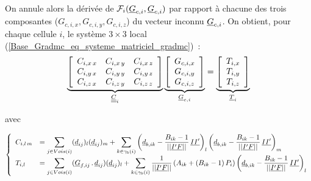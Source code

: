 On annule alors la d\'eriv\'ee de
$\mathcal{F}_i(\underline{G}_{c,i},\underline{G}_{c,i})$ 
par rapport \`a
chacune des trois composantes ($G_{c,i,x}, G_{c,i,y}, G_{c,i,z}$) du vecteur
inconnu $\underline{G}_{c,i}$. On 
obtient, pour chaque cellule $i$, le syst\`eme $3\times3$ local
(\ref{Base_Gradmc_eq_systeme_matriciel_gradmc})~: 
\begin{equation}\label{Base_Gradmc_eq_systeme_matriciel_gradmc}
\underbrace{
\left[\begin{array}{ccc}
\displaystyle
C_{i,x\,x}
& C_{i,x\,y}
& C_{i,x\,z}\\
\displaystyle
C_{i,y\,x}
& C_{i,y\,y}
& C_{i,y\,z}\\
\displaystyle
C_{i,z\,x}
& C_{i,z\,y}
& C_{i,z\,z}
\end{array}\right]
}_{\underline{\underline{C}}_i}
\underbrace{
\left[\begin{array}{c}
G_{c,i,x} \\ G_{c,i,y} \\ G_{c,i,z}
\end{array}\right]
}_{\underline{G}_{c,i}}
=
\underbrace{
\left[\begin{array}{c}
\displaystyle
T_{i,x}\\
\displaystyle
T_{i,y}\\
\displaystyle
T_{i,z}
\end{array}\right]
}_{\underline{T}_{i}}
\end{equation}

avec 


\begin{equation}
\left\{\begin{array}{ll}
C_{i,l\,m} &=\displaystyle
 \sum\limits_{j\in Vois(i)}(\underline{d}_{ij})_{l}(\underline{d}_{ij})_{m} 
+\sum\limits_{k\in\gamma_b(i)}\left(\underline{d}_{b,ik}-\frac{B_{ik}-1}{||\underline{I'F}||}\,\underline{II'}\right)_{l}
                              \left(\underline{d}_{b,ik}-\frac{B_{ik}-1}{||\underline{I'F}||}\,\underline{II'}\right)_{m} \\
T_{i,l} &=\displaystyle
 \sum\limits_{j\in Vois(i)}(\underline{G}_{f,ij}\,.\,\underline{d}_{ij})(\underline{d}_{ij})_l
+\sum\limits_{k\in \gamma_b(i)}\frac{1}{||\underline{I'F}||}\left(A_{ik}+(B_{ik}-1)\,P_{i}\right)
                              \left(\underline{d}_{b,ik}-\frac{B_{ik}-1}{||\underline{I'F}||}\,\underline{II'}\right)_l 
\end{array}\right.
\end{equation}

